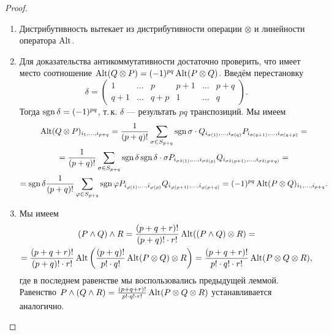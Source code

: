\begin{proof}
    \begin{enumerate}
        \item Дистрибутивность вытекает из дистрибутивности операции $\otimes$ и линейности оператора $\operatorname{Alt}$.
        \item Для доказательства антикоммутативности достаточно проверить, что имеет место соотношение $\operatorname{Alt}(Q \otimes P) = (-1)^{pq}\operatorname{Alt}(P \otimes Q)$. Введём перестановку
            \[
                \delta =
                \begin{pmatrix}
                    1 & \ldots & p & p + 1 & \ldots & p + q\\
                    q + 1 & \ldots & q + p & 1 & \ldots & q
                \end{pmatrix}.
            \]
            Тогда $\operatorname{sgn}\delta = (-1)^{pq}$, т.\,к. $\delta$ --- результать $pq$ транспозиций. Мы имеем
            \begin{multline*}
                \operatorname{Alt}(Q \otimes P)_{i_1, \ldots, i_{p + q}} = \frac{1}{(p + q)!}\sum_{\sigma \in S_{p + q}}\operatorname{sgn}\sigma \cdot Q_{i_{\sigma(1)}, \ldots, i_{\sigma(q)}}P_{i_{\sigma(q + 1)}, \ldots, i_{\sigma(q + p)}} =\\ = \frac{1}{(p + q)!}\sum_{\sigma \in S_{p + q}}\operatorname{sgn}\delta\operatorname{sgn}\delta \cdot \sigma P_{i_{\sigma\delta(1)}, \ldots, i_{\sigma\delta(p)}}Q_{i_{\sigma\delta(p + 1)}, \ldots, i_{\sigma\delta(p + q)}} =\\ =\operatorname{sgn}\delta\frac{1}{(p + q)!}\sum_{\varphi \in S_{p + q}}\operatorname{sgn}\varphi P_{i_{\varphi(1)}, \ldots, i_{\varphi(p)}} Q_{i_{\varphi(p + 1)}, \ldots, i_{\varphi(p + q)}} = (-1)^{pq}\operatorname{Alt}(P \otimes Q)_{i_1, \ldots, i_{p + q}}.
            \end{multline*}
        \item Мы имеем
            \begin{multline*}
                (P \wedge Q) \wedge R = \frac{(p + q + r)!}{(p + q)! \cdot r!}\operatorname{Alt}((P \wedge Q) \otimes R) =\\ = \frac{(p + q + r)!}{(p + q)! \cdot r!}\operatorname{Alt}\left(\frac{(p + q)!}{p! \cdot q!}\operatorname{Alt}(P \otimes Q) \otimes R\right) = \frac{(p + q + r)!}{p! \cdot q! \cdot r!}\operatorname{Alt}(P \otimes Q \otimes R),
            \end{multline*}
            где в последнем равенстве мы воспользовались предыдущей леммой. Равенство $P \wedge (Q \wedge R) = \frac{(p + q + r)!}{p! \cdot q! \cdot r!}\operatorname{Alt}(P \otimes Q \otimes R)$ устанавливается аналогично.
    \end{enumerate}
\end{proof}

